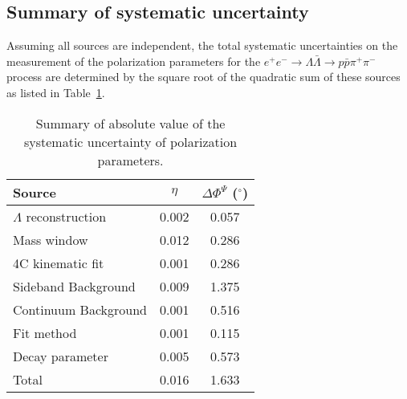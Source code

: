 \documentclass[a4paper,11pt]{article}
\begin{document}
\subsection{Summary of systematic uncertainty}
Assuming all sources are independent,
the total systematic uncertainties on the measurement of 
the polarization parameters for the $e^+e^-\to\Lambda\bar\Lambda\to p\bar{p}\pi^{+}\pi^{-}$ process are determined by the square root of the quadratic sum of these sources as listed in Table~\ref{uncertainty}.
\begin{table}[!htbp]
\caption{\small Summary of absolute value of the systematic uncertainty of polarization parameters.}
\centering
\begin{tabular}{l c c}\hline \hline
Source 	& $\eta$   &$\Delta\Phi^{\Psi}$ ($^\circ$)\\	
\hline
$\Lambda$ reconstruction   &0.002     &0.057\\
Mass window          &0.012    &0.286      \\
4C kinematic fit     &0.001	   &0.286	 \\
Sideband Background           &0.009    &1.375    \\
Continuum Background           &0.001    &0.516    \\
Fit method		     &0.001    &0.115	 \\
Decay parameter      &0.005    &0.573    \\\hline
Total                &0.016    &1.633\\
\hline
\hline
\end{tabular}
\label{uncertainty}
\end{table}
\end{document}
